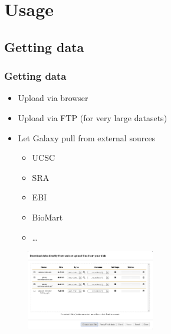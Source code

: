 \documentclass{beamer}              %
\begin{document}
\section{Usage}
\subsection{Getting data}
\begin{frame}
    \frametitle{Getting data}
    \begin{itemize}
	    \item Upload via browser
	    \item Upload via FTP (for very large datasets)
	    \item Let Galaxy pull from external sources
	    \begin{itemize}
	    	\item UCSC
		    \item SRA
		    \item EBI
		    \item BioMart
		    \item \dots
	    \end{itemize}
    \end{itemize}
	\begin{figure}
		\includegraphics[width=0.5\textwidth,left]{figures/101p_03.png}
	\end{figure}
\end{frame}
\end{document}

